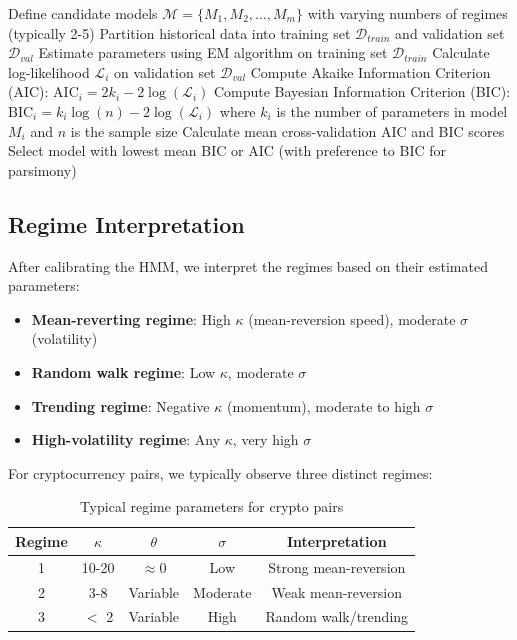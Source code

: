 \documentclass{article}
\begin{document}
\begin{algorithm}
\caption{Model Selection Framework}
\begin{algorithmic}[1]
\STATE Define candidate models $\mathcal{M} = \{M_1, M_2, \ldots, M_m\}$ with varying numbers of regimes (typically 2-5)
\STATE Partition historical data into training set $\mathcal{D}_{train}$ and validation set $\mathcal{D}_{val}$
        \STATE Estimate parameters using EM algorithm on training set $\mathcal{D}_{train}$
        \STATE Calculate log-likelihood $\mathcal{L}_i$ on validation set $\mathcal{D}_{val}$
        \STATE Compute Akaike Information Criterion (AIC): $\text{AIC}_i = 2k_i - 2\log(\mathcal{L}_i)$
        \STATE Compute Bayesian Information Criterion (BIC): $\text{BIC}_i = k_i\log(n) - 2\log(\mathcal{L}_i)$
        \STATE where $k_i$ is the number of parameters in model $M_i$ and $n$ is the sample size
    \ENDFOR
    \STATE Calculate mean cross-validation AIC and BIC scores
\ENDFOR
\STATE Select model with lowest mean BIC or AIC (with preference to BIC for parsimony)
\end{algorithmic}
\end{algorithm}

\subsection{Regime Interpretation}

After calibrating the HMM, we interpret the regimes based on their estimated parameters:

\begin{itemize}
    \item \textbf{Mean-reverting regime}: High $\kappa$ (mean-reversion speed), moderate $\sigma$ (volatility)
    \item \textbf{Random walk regime}: Low $\kappa$, moderate $\sigma$
    \item \textbf{Trending regime}: Negative $\kappa$ (momentum), moderate to high $\sigma$
    \item \textbf{High-volatility regime}: Any $\kappa$, very high $\sigma$
\end{itemize}

For cryptocurrency pairs, we typically observe three distinct regimes:
\begin{table}[h]
\centering
\begin{tabular}{|c|c|c|c|c|}
\hline
\textbf{Regime} & $\kappa$ & $\theta$ & $\sigma$ & \textbf{Interpretation} \\
\hline
1 & 10-20 & $\approx 0$ & Low & Strong mean-reversion \\
2 & 3-8 & Variable & Moderate & Weak mean-reversion \\
3 & $<$ 2 & Variable & High & Random walk/trending \\
\hline
\end{tabular}
\caption{Typical regime parameters for crypto pairs}
\end{table}
\end{document}
